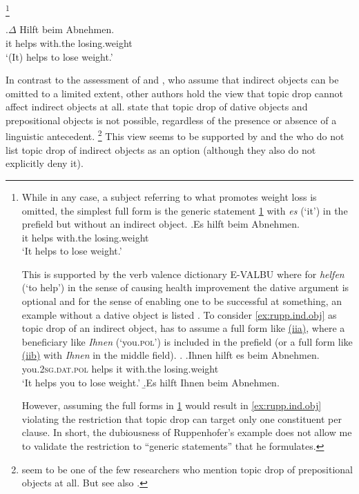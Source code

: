 \footnote{While in any case, a subject referring to what promotes weight loss is omitted, the simplest full form is the generic statement \ref{ex:rupp.ind.obj.ff.simple} with \textit{es} (`it') in the prefield but without an indirect object. \vspace{-\baselineskip}
\exg.\label{ex:rupp.ind.obj.ff.simple}Es hilft beim Abnehmen.\\
it helps with.the losing.weight\\
`It helps to lose weight.'\par %
This is supported by the verb valence dictionary E-VALBU where for \textit{helfen} (`to help') in the sense of causing health improvement the dative argument is optional \citep{helfen1} and for the sense of enabling one to be successful at something, an example without a dative object is listed \citep{helfen2}.
To consider \ref{ex:rupp.ind.obj} as topic drop of an indirect object, \citet{ruppenhofer2018} has to assume a full form like \hyperref[ex:rupp.ind.obj.ff.2]{(iia)}, where a beneficiary like \textit{Ihnen} (`you.\textsc{pol}') is included in the prefield (or a full form like \hyperref[ex:rupp.ind.obj.ff.3]{(iib)} with \textit{Ihnen} in the middle field). %
\ex.\label{ex:rupp.ind.obj.ff.23}
\ag.\label{ex:rupp.ind.obj.ff.2}Ihnen hilft es beim Abnehmen.\\
you.\textsc{2sg.dat.pol} helps it with.the losing.weight\\
`It helps you to lose weight.'
\b.\label{ex:rupp.ind.obj.ff.3}Es hilft Ihnen beim Abnehmen.\par %
However, assuming the full forms in \ref{ex:rupp.ind.obj.ff.23} would result in \ref{ex:rupp.ind.obj} violating the restriction that topic drop can target only one constituent per clause.
In short, the dubiousness of Ruppenhofer's example does not allow me to validate the restriction to ``generic statements'' that he formulates.
}

\exg.\label{ex:rupp.ind.obj}$\Delta$ Hilft beim Abnehmen.\\
it helps with.the losing.weight\\
`(It) helps to lose weight.' \citep[224, footnote 14]{ruppenhofer2018}

In contrast to the assessment of \citet{schalowski2015} and \citet{ruppenhofer2018}, who assume that indirect objects can be omitted to a limited extent, other authors hold the view that topic drop cannot affect indirect objects at all.
\citet[418]{zifonun.etal1997} state that topic drop of dative objects  and prepositional objects  is not possible, regardless of the presence or absence of a linguistic antecedent.%
\footnote{\citet{zifonun.etal1997} seem to be one of the few researchers who mention topic drop of prepositional objects  at all. 
But see also \citet[25]{trutkowski2016}.}
%
This view seems to be supported by \citet{jaensch2005} and the \citet{duden2016, duden2022} who do not list topic drop of indirect objects as an option (although they also do not explicitly deny it).

